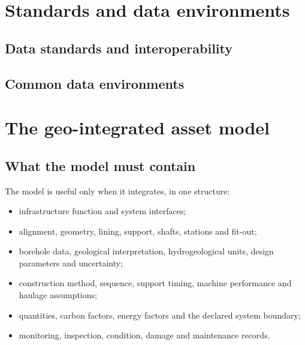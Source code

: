 \section{Standards and data environments}
\label{sec:standards-and-data-environments}

\subsection{Data standards and interoperability}
\label{sec:data-standards}

\subsection{Common data environments}
\label{sec:cde}

\section{The geo-integrated asset model}
\label{sec:geo-integrated-model}

\subsection{What the model must contain}
\label{sec:model-contents}
The model is useful only when it integrates, in one structure:

\begin{itemize}[nosep]
  \item infrastructure function and system interfaces;
  \item alignment, geometry, lining, support, shafts, stations and fit-out;
  \item borehole data, geological interpretation, hydrogeological units,
        design parameters and uncertainty;
  \item construction method, sequence, support timing, machine performance and
        haulage assumptions;
  \item quantities, carbon factors, energy factors and the declared system
        boundary;
  \item monitoring, inspection, condition, damage and maintenance records.
\end{itemize}

